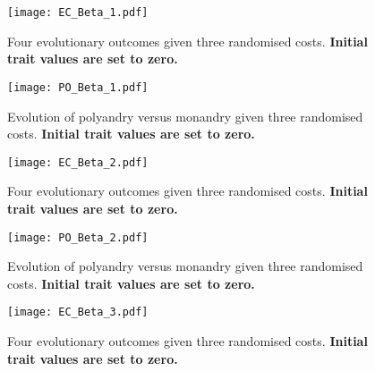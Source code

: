 \documentclass[12pt]{article}
\begin{document}
\clearpage


\begin{figure}
\begin{center}				
\texttt{[image: EC\_Beta\_1.pdf]}
\end{center}
\caption{Four evolutionary outcomes given three randomised costs. \textbf{Initial trait values are set to zero.}}
\end{figure}

\begin{figure}
\begin{center}				
\texttt{[image: PO\_Beta\_1.pdf]}
\end{center}
\caption{Evolution of polyandry versus monandry given three randomised costs. \textbf{Initial trait values are set to zero.}}
\end{figure}

\clearpage


\begin{figure}
\begin{center}				
\texttt{[image: EC\_Beta\_2.pdf]}
\end{center}
\caption{Four evolutionary outcomes given three randomised costs. \textbf{Initial trait values are set to zero.}}
\end{figure}

\begin{figure}
\begin{center}				
\texttt{[image: PO\_Beta\_2.pdf]}
\end{center}
\caption{Evolution of polyandry versus monandry given three randomised costs. \textbf{Initial trait values are set to zero.}}
\end{figure}

\clearpage


\begin{figure}
\begin{center}				
\texttt{[image: EC\_Beta\_3.pdf]}
\end{center}
\caption{Four evolutionary outcomes given three randomised costs. \textbf{Initial trait values are set to zero.}}
\end{figure}
\end{document}
